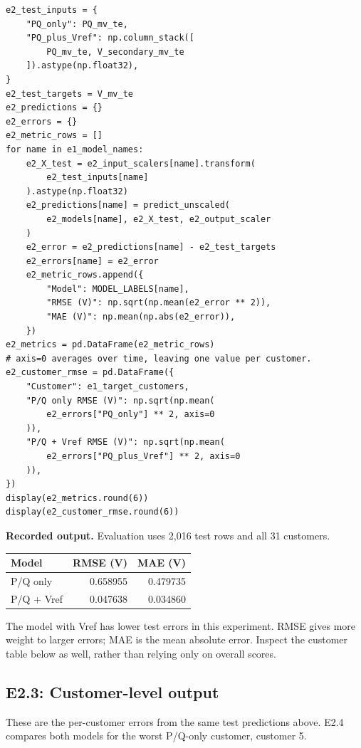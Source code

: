 \documentclass[11pt,a4paper]{article}
\begin{document}
\begin{lstlisting}
e2_test_inputs = {
    "PQ_only": PQ_mv_te,
    "PQ_plus_Vref": np.column_stack([
        PQ_mv_te, V_secondary_mv_te
    ]).astype(np.float32),
}
e2_test_targets = V_mv_te
e2_predictions = {}
e2_errors = {}
e2_metric_rows = []
for name in e1_model_names:
    e2_X_test = e2_input_scalers[name].transform(
        e2_test_inputs[name]
    ).astype(np.float32)
    e2_predictions[name] = predict_unscaled(
        e2_models[name], e2_X_test, e2_output_scaler
    )
    e2_error = e2_predictions[name] - e2_test_targets
    e2_errors[name] = e2_error
    e2_metric_rows.append({
        "Model": MODEL_LABELS[name],
        "RMSE (V)": np.sqrt(np.mean(e2_error ** 2)),
        "MAE (V)": np.mean(np.abs(e2_error)),
    })
e2_metrics = pd.DataFrame(e2_metric_rows)
# axis=0 averages over time, leaving one value per customer.
e2_customer_rmse = pd.DataFrame({
    "Customer": e1_target_customers,
    "P/Q only RMSE (V)": np.sqrt(np.mean(
        e2_errors["PQ_only"] ** 2, axis=0
    )),
    "P/Q + Vref RMSE (V)": np.sqrt(np.mean(
        e2_errors["PQ_plus_Vref"] ** 2, axis=0
    )),
})
display(e2_metrics.round(6))
display(e2_customer_rmse.round(6))
\end{lstlisting}

\textbf{Recorded output.} Evaluation uses 2,016 test rows and all 31 customers.
\begin{center}
\begin{tabular}{lrr}
\toprule
Model & RMSE (V) & MAE (V) \\
\midrule
P/Q only & 0.658955 & 0.479735 \\
P/Q + Vref & 0.047638 & 0.034860 \\
\bottomrule
\end{tabular}
\end{center}
The model with Vref has lower test errors in this experiment. RMSE gives
more weight to larger errors; MAE is the mean absolute error. Inspect the
customer table below as well, rather than relying only on overall scores.

\clearpage
\subsection*{E2.3: Customer-level output}
These are the per-customer errors from the same test predictions above.
E2.4 compares both models for the worst P/Q-only customer, customer 5.
\end{document}
